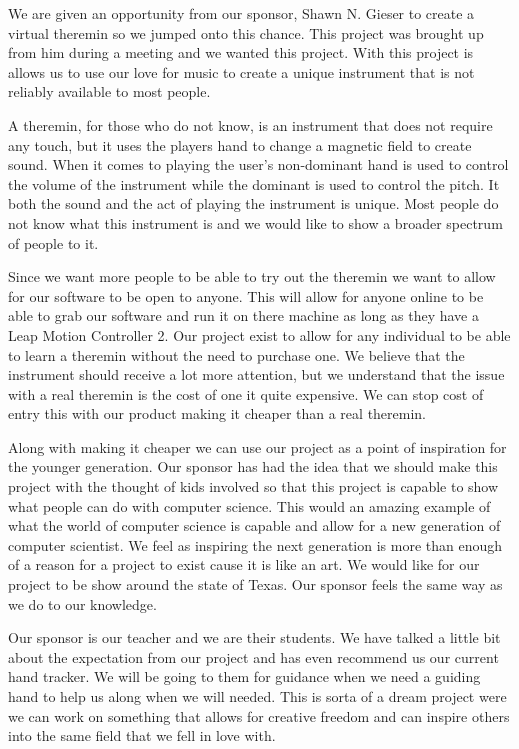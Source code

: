 \quad We are given an opportunity from our sponsor, Shawn N. Gieser to create a virtual theremin so we jumped onto this chance. This project was brought up from him during a meeting and we wanted this project. With this project is allows us to use our love for music to create a unique instrument that is not reliably available to most people. 

\quad A theremin, for those who do not know, is an instrument that does not require any touch, but it uses the players hand to change a magnetic field to create sound. When it comes to playing the user's non-dominant  hand is used to control the volume of the instrument while the dominant  is used to control the pitch. It both the sound and the act of playing the instrument is unique. Most people do not know what this instrument is and we would like to show a broader spectrum of people to it. 

\quad Since we want more people to be able to try out the theremin we want to allow for our software to be open to anyone. This will allow for anyone online to be able to grab our software and run it on there machine as long as they have a Leap Motion Controller 2. Our project exist to allow for any individual to be able to learn a theremin without the need to purchase one. We believe that the instrument should receive a lot more attention, but we understand that the issue with a real theremin is the cost of one it quite expensive. We can stop cost of entry this with our product making it cheaper than a real theremin.

\quad Along with making it cheaper we can use our project as a point of inspiration for the younger generation. Our sponsor has had the idea that we should make this project with the thought of kids involved so that this project is capable to show what people can do with computer science. This would an amazing example of what the world of computer science is capable and allow for a new generation of computer scientist. We feel as inspiring the next generation is more than enough of a reason for a project to exist cause it is like an art. We would like for our project to be show around the state of Texas. Our sponsor feels the same way as we do to our knowledge.

\quad Our sponsor is our teacher and we are their students. We have talked a little bit about the expectation from our project and has even recommend us our current hand tracker. We will be going to them for guidance when we need a guiding hand to help us along when we will needed. This is sorta of a dream project were we can work on something that allows for creative freedom and can inspire others into the same field that we fell in love with. 
